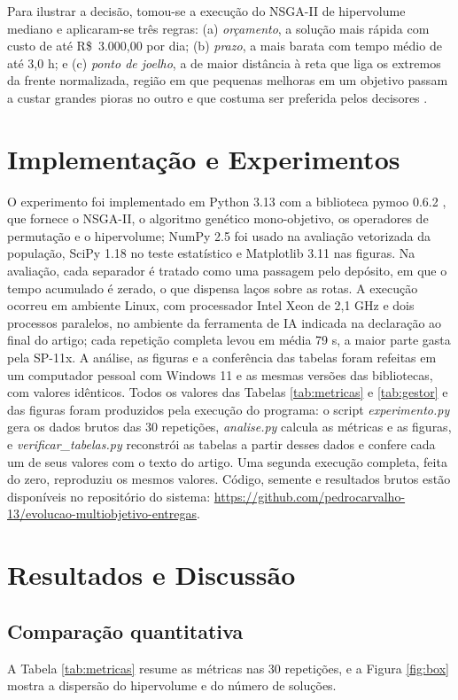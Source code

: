 \documentclass[a4paper,12pt]{article}
\begin{document}
Para ilustrar a decisão, tomou-se a execução do NSGA-II de hipervolume mediano e aplicaram-se três regras: (a) \emph{orçamento}, a solução mais rápida com custo de até R\$~3.000,00 por dia; (b) \emph{prazo}, a mais barata com tempo médio de até 3,0 h; e (c) \emph{ponto de joelho}, a de maior distância à reta que liga os extremos da frente normalizada, região em que pequenas melhoras em um objetivo passam a custar grandes pioras no outro e que costuma ser preferida pelos decisores \citep{branke2004}.


\section{Implementação e Experimentos}\label{sec:impl}
\noindent O experimento foi implementado em Python 3.13 com a biblioteca pymoo 0.6.2 \citep{blank2020}, que fornece o NSGA-II, o algoritmo genético mono-objetivo, os operadores de permutação e o hipervolume; NumPy 2.5 foi usado na avaliação vetorizada da população, SciPy 1.18 no teste estatístico e Matplotlib 3.11 nas figuras. Na avaliação, cada separador é tratado como uma passagem pelo depósito, em que o tempo acumulado é zerado, o que dispensa laços sobre as rotas. A execução ocorreu em ambiente Linux, com processador Intel Xeon de 2,1 GHz e dois processos paralelos, no ambiente da ferramenta de IA indicada na declaração ao final do artigo; cada repetição completa levou em média 79 s, a maior parte gasta pela SP-11x. A análise, as figuras e a conferência das tabelas foram refeitas em um computador pessoal com Windows 11 e as mesmas versões das bibliotecas, com valores idênticos. Todos os valores das Tabelas \ref{tab:metricas} e \ref{tab:gestor} e das figuras foram produzidos pela execução do programa: o script \emph{experimento.py} gera os dados brutos das 30 repetições, \emph{analise.py} calcula as métricas e as figuras, e \emph{verificar\_tabelas.py} reconstrói as tabelas a partir desses dados e confere cada um de seus valores com o texto do artigo. Uma segunda execução completa, feita do zero, reproduziu os mesmos valores. Código, semente e resultados brutos estão disponíveis no repositório do sistema: \url{https://github.com/pedrocarvalho-13/evolucao-multiobjetivo-entregas}.


\section{Resultados e Discussão}\label{sec:res}

\subsection{Comparação quantitativa}\label{sec:quant}
\noindent A Tabela \ref{tab:metricas} resume as métricas nas 30 repetições, e a Figura \ref{fig:box} mostra a dispersão do hipervolume e do número de soluções.
\end{document}
